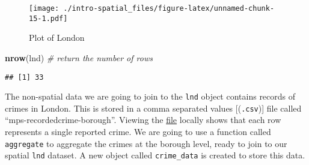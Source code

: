 \documentclass[]{article}
\newenvironment{Shaded}{}{}
\newcommand{\KeywordTok}[1]{\textcolor[rgb]{0.00,0.44,0.13}{\textbf{{#1}}}}
\newcommand{\DataTypeTok}[1]{\textcolor[rgb]{0.56,0.13,0.00}{{#1}}}
\newcommand{\DecValTok}[1]{\textcolor[rgb]{0.25,0.63,0.44}{{#1}}}
\newcommand{\StringTok}[1]{\textcolor[rgb]{0.25,0.44,0.63}{{#1}}}
\newcommand{\CommentTok}[1]{\textcolor[rgb]{0.38,0.63,0.69}{\textit{{#1}}}}
\newcommand{\NormalTok}[1]{{#1}}
\begin{document}
\begin{figure}[htbp]
\centering
\texttt{[image: ./intro-spatial\_files/figure-latex/unnamed-chunk-15-1.pdf]}
\caption{Plot of London}
\end{figure}

\begin{Shaded}
\begin{Highlighting}[]
\KeywordTok{nrow}\NormalTok{(lnd) }\CommentTok{# return the number of rows}
\end{Highlighting}
\end{Shaded}

\begin{verbatim}
## [1] 33
\end{verbatim}

The non-spatial data we are going to join to the \texttt{lnd} object
contains records of crimes in London. This is stored in a comma
separated values {[}(\texttt{.csv}){]} file called
``mps-recordedcrime-borough''. Viewing the
\href{https://raw.githubusercontent.com/Robinlovelace/Creating-maps-in-R/master/data/mps-recordedcrime-borough.csv}{file}
locally shows that each row represents a single reported crime. We are
going to use a function called \texttt{aggregate} to aggregate the
crimes at the borough level, ready to join to our spatial \texttt{lnd}
dataset. A new object called \texttt{crime\_data} is created to store
this data.

\begin{Shaded}
\end{Shaded}
\end{document}
